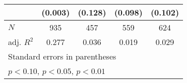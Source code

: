 {\begin{tabular}{l*{4}{c}}
            &     (0.003)         &     (0.128)         &     (0.098)         &     (0.102)         \\
\hline
\(N\)       &         935         &         457         &         559         &         624         \\
adj. \(R^{2}\)&       0.277         &       0.036         &       0.019         &       0.029         \\
\hline\hline
\multicolumn{5}{l}{\footnotesize Standard errors in parentheses}\\
\multicolumn{5}{l}{\footnotesize \sym{*} \(p<0.10\), \sym{**} \(p<0.05\), \sym{***} \(p<0.01\)}\\
\end{tabular}
}
